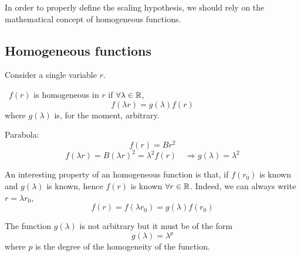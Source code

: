 \documentclass[../main/main.tex]{subfiles}
\begin{document}
In order to properly define the scaling hypothesis, we should rely on the mathematical concept of homogeneous functions.

\subsection{Homogeneous functions}
Consider a single variable \( r \).
\begin{definition} \
\( f(r) \) is homogeneous in \( r \) if \( \forall \lambda \in \mathbb{R} \),
\begin{equation}
  f (\lambda r) = g (\lambda ) f(r)
\end{equation}
where \( g(\lambda ) \) is, for the moment, arbitrary.
\end{definition}
\begin{example}
  Parabola:
\begin{equation}
  f(r) = B r^2
\end{equation}
\begin{equation}
  f ( \lambda r) = B ( \lambda r)^2 = \lambda ^2 f (r) \quad \Rightarrow g ( \lambda ) = \lambda ^2
\end{equation}
\end{example}
\begin{remark}
An interesting property of an homogeneous function is that, if \( f(r_0) \) is known and \( g(\lambda ) \) is known, hence \( f(r) \) is known \( \forall r \in \mathbb{R} \).
Indeed, we can always write \( r=\lambda r_0 \),
\begin{equation}
  f(r) = f (\lambda r_0) = g(\lambda ) f(r_0)
\end{equation}
\end{remark}
\begin{theorem}[]
  The function \( g(\lambda ) \) is not arbitrary but it must be of the form
\begin{equation}
  g(\lambda ) = \lambda ^p
\end{equation}
where \( p \) is the degree of the homogeneity of the function.
\end{theorem}
\end{document}
